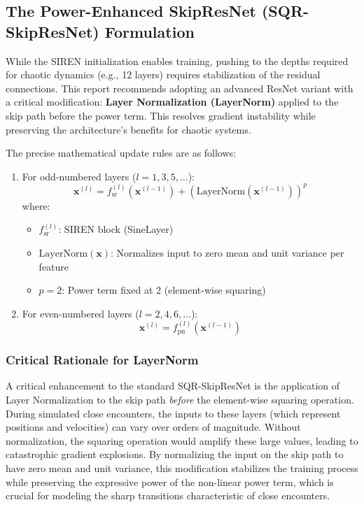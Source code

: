 \subsection{The Power-Enhanced SkipResNet (SQR-SkipResNet) Formulation}
While the SIREN initialization enables training, pushing to the depths required for chaotic dynamics (e.g., 12 layers) requires
stabilization of the residual connections. This report recommends adopting an advanced ResNet variant with a critical modification:
\textbf{Layer Normalization (LayerNorm)} applied to the skip path before the power term.
This resolves gradient instability while preserving the architecture's benefits for chaotic systems.


The precise mathematical update rules are as follows:

\begin{enumerate}
    \item For odd-numbered layers ($l = 1, 3, 5, \ldots$):
    $$
        \mathbf{x}^{(l)} = f_{\text{sr}}^{(l)}(\mathbf{x}^{(l-1)}) + \left(\text{LayerNorm}(\mathbf{x}^{(l-1)})\right)^p
    $$
    where:
    \begin{itemize}
        \item $f_{\text{sr}}^{(l)}$: SIREN block (SineLayer)
        \item $\text{LayerNorm}(\mathbf{x})$: Normalizes input to zero mean and unit variance per feature
        \item $p = 2$: Power term fixed at 2 (element-wise squaring)
    \end{itemize}

    \item For even-numbered layers ($l = 2, 4, 6, \ldots$):
    $$
        \mathbf{x}^{(l)} = f_{\text{pn}}^{(l)}(\mathbf{x}^{(l-1)})
    $$
\end{enumerate}

\subsubsection*{Critical Rationale for LayerNorm}

A critical enhancement to the standard SQR-SkipResNet is the application of Layer Normalization to the skip path \emph{before} the element-wise squaring operation.
During simulated close encounters, the inputs to these layers (which represent positions and velocities) can vary over orders of magnitude. Without normalization,
the squaring operation would amplify these large values, leading to catastrophic gradient explosions. By normalizing the input on the skip path to have zero mean
and unit variance, this modification stabilizes the training process while preserving the expressive power of the non-linear power term, which is crucial for
modeling the sharp transitions characteristic of close encounters.



